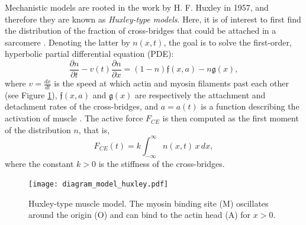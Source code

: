 \documentclass{sfuthesis}
\numberwithin{equation}{section}
\numberwithin{figure}{chapter}
\numberwithin{table}{chapter}
\theoremstyle{definition}
\newcommand{\pder}[2]{\dfrac{\partial #1}{\partial #2}}
\begin{document}
Mechanistic models are rooted in the work by H. F. Huxley \cite{Huxley1957} in 1957, and therefore they are known as \textit{Huxley-type models}. Here, it is of interest to first find the distribution of the fraction of cross-bridges that could be attached in a sarcomere \cite{GordonHuxleyJulian1966, Huxley1957}. Denoting the latter by $n(x,t)$, the goal is to solve the first-order, hyperbolic partial differential equation (PDE):
\[
 \pder{n}{t} - v(t) \pder{n}{x} = (1-n) \mathfrak{f}(x,a) - n \mathfrak{g}(x),
\]
where $v = \frac{dx}{dt}$ is the speed at which actin and myosin filaments past each other (see Figure \ref{fig:diagram_huxley}), $\mathfrak{f}(x,a)$ and $\mathfrak{g}(x)$ are respectively the attachment and detachment rates of the cross-bridges, and $a = a(t)$ is a function describing the activation of muscle \cite{Milicevic2022HuxleySurrogates}. The active force $F_{CE}$ is then computed as the first moment of the distribution $n$, that is,
\[
F_{CE}(t) = k \int_{-\infty}^\infty n(x,t) \, x \, dx,
\]
where the constant $k > 0$ is the stiffness of the cross-bridges. 

\begin{figure}
    \centering
    \texttt{[image: diagram\_model\_huxley.pdf]}
    \caption{Huxley-type muscle model. The myosin binding site (M) oscillates around the origin (O) and can bind to the actin head (A) for $x>0$.\label{fig:diagram_huxley}}
\end{figure}
\end{document}
